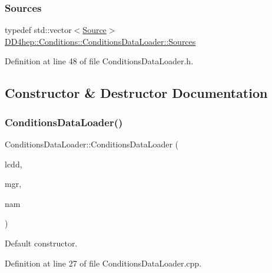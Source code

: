 \subsubsection{\texorpdfstring{Sources}{Sources}}
{\footnotesize\ttfamily typedef std\+::vector$<$\hyperlink{class_d_d4hep_1_1_conditions_1_1_conditions_data_loader_acad32659f22e37a422ec6abdb4f95b3e}{Source}$>$ \hyperlink{class_d_d4hep_1_1_conditions_1_1_conditions_data_loader_a10469a47fdf0b7949194f79c35ee9510}{D\+D4hep\+::\+Conditions\+::\+Conditions\+Data\+Loader\+::\+Sources}}



Definition at line 48 of file Conditions\+Data\+Loader.\+h.



\subsection{Constructor \& Destructor Documentation}
\hypertarget{class_d_d4hep_1_1_conditions_1_1_conditions_data_loader_a893800746f5a864696c4486469057567}{}\label{class_d_d4hep_1_1_conditions_1_1_conditions_data_loader_a893800746f5a864696c4486469057567} 
\subsubsection{\texorpdfstring{Conditions\+Data\+Loader()}{ConditionsDataLoader()}}
{\footnotesize\ttfamily Conditions\+Data\+Loader\+::\+Conditions\+Data\+Loader (\begin{DoxyParamCaption}\item[{\hyperlink{class_d_d4hep_1_1_geometry_1_1_l_c_d_d}{L\+C\+DD} \&}]{lcdd,  }\item[{\hyperlink{class_d_d4hep_1_1_conditions_1_1_conditions_manager}{Conditions\+Manager}}]{mgr,  }\item[{const std\+::string}]{nam }\end{DoxyParamCaption})}



Default constructor. 



Definition at line 27 of file Conditions\+Data\+Loader.\+cpp.




